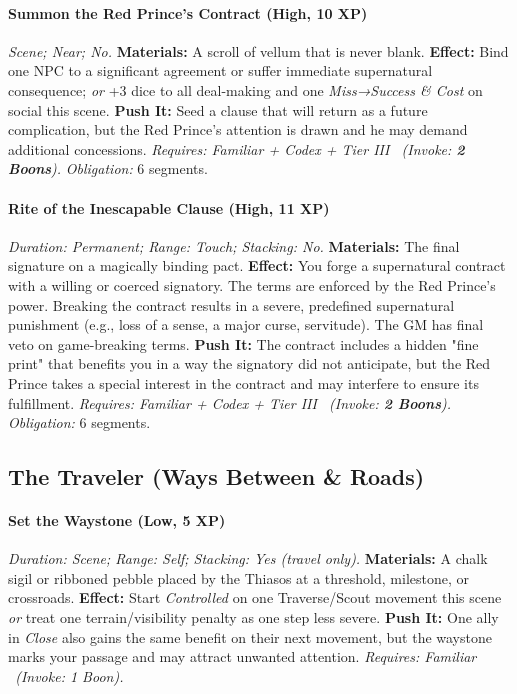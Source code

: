\paragraph{Summon the Red Prince's Contract (High, 10 XP)} \emph{Scene; Near; No.}
\textbf{Materials:} A scroll of vellum that is never blank.
\textbf{Effect:} Bind one NPC to a significant agreement or suffer immediate supernatural consequence; \emph{or} +3 dice to all deal-making and one \emph{Miss→Success \& Cost} on social this scene.
\textbf{Push It:} Seed a clause that will return as a future complication, but the Red Prince's attention is drawn and he may demand additional concessions.
\emph{Requires: Familiar + Codex + Tier III \ (\textit{Invoke:} \textbf{2 Boons}).}
\emph{Obligation:} 6 segments.

\paragraph{Rite of the Inescapable Clause (High, 11 XP)} \emph{Duration: Permanent; Range: Touch; Stacking: No.}
\textbf{Materials:} The final signature on a magically binding pact.
\textbf{Effect:} You forge a supernatural contract with a willing or coerced signatory. The terms are enforced by the Red Prince's power. Breaking the contract results in a severe, predefined supernatural punishment (e.g., loss of a sense, a major curse, servitude). The GM has final veto on game-breaking terms.
\textbf{Push It:} The contract includes a hidden "fine print" that benefits you in a way the signatory did not anticipate, but the Red Prince takes a special interest in the contract and may interfere to ensure its fulfillment.
\emph{Requires: Familiar + Codex + Tier III \ (\textit{Invoke:} \textbf{2 Boons}).}
\emph{Obligation:} 6 segments.

\subsection{The Traveler (Ways Between \& Roads)}
\paragraph{Set the Waystone (Low, 5 XP)} \emph{Duration: Scene; Range: Self; Stacking: Yes (travel only).}
\textbf{Materials:} A chalk sigil or ribboned pebble placed by the Thiasos at a threshold, milestone, or crossroads.
\textbf{Effect:} Start \emph{Controlled} on one Traverse/Scout movement this scene \emph{or} treat one terrain/visibility penalty as one step less severe.
\textbf{Push It:} One ally in \emph{Close} also gains the same benefit on their next movement, but the waystone marks your passage and may attract unwanted attention.
\emph{Requires: Familiar \ (\textit{Invoke:} 1 Boon).}
